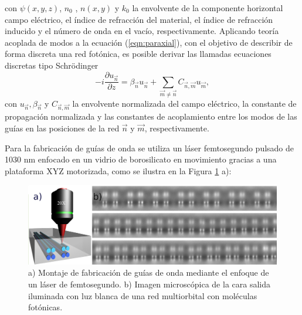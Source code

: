 \documentclass[12pt, letterpaper]{article}
\begin{document}
con $\psi(x,y,z)$, $n_0$ , $n(x,y)$ y $k_0$ la envolvente de la componente horizontal campo eléctrico, el índice de refracción del material, el índice de refracción inducido y el número de onda en el vacío, respectivamente. Aplicando teoría acoplada de modos \cite{coupledmodetheory} a la ecuación (\ref{eqn:paraxial}), con el objetivo de describir de forma discreta una red fotónica, es posible derivar las llamadas ecuaciones discretas tipo Schrödinger \cite{discretesolitons, artificialFB, FBdynamics}
\begin{equation}
	-i\frac{\partial u_{\vec{n}} }{\partial z} = \beta_{\vec{n}}u_{\vec{n}} + \sum_{\vec{m}\neq\vec{n}} C_{\vec{n},\vec{m}}u_{\vec{m}}, \label{eqn:CMT}
\end{equation}
con $u_{\vec{n}}, \beta_{\vec{n}}$ y $C_{\vec{n}, \vec{m}}$ la envolvente normalizada del campo eléctrico, la constante de propagación normalizada y las constantes de acoplamiento entre los modos de las guías en las posiciones de la red $\vec{n}$ y $\vec{m}$, respectivamente.


Para la fabricación de guías de onda se utiliza un láser femtosegundo pulsado de 1030 nm enfocado en un vidrio de borosilicato en movimiento gracias a una plataforma XYZ motorizada, como se ilustra en la Figura \ref{fig:femtosetup} a): 

\begin{figure}[H]
	\centering
	\includegraphics[width=0.7\linewidth]{./media/femtosetup.png}
	\caption{a) Montaje de fabricación de guías de onda mediante el enfoque de un láser de femtosegundo. b) Imagen microscópica de la cara salida iluminada con luz blanca de una red multiorbital con moléculas fotónicas. \label{fig:femtosetup}}
\end{figure}
\end{document}
